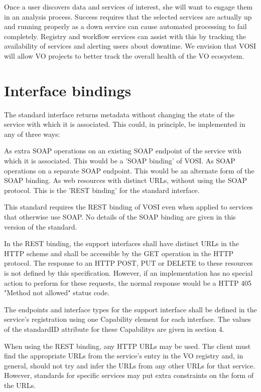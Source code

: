 \documentclass[11pt,letter]{ivoa}
\begin{document}
Once a user discovers data and services of interest, she will want to engage them in an analysis process. Success requires that the selected services are actually up and running properly as a down service can cause automated processing to fail completely. Registry and workflow services can assist with this by tracking the availability of services and alerting users about downtime. We envision that VOSI will allow VO projects to better track the overall health of the VO ecosystem. 

\section{Interface bindings}

The standard interface returns metadata without changing the state of the service with which it is associated. This could, in principle, be implemented in any of three ways:

    As extra SOAP operations on an existing SOAP endpoint of the service with which it is associated. This would be a 'SOAP binding' of VOSI.
    As SOAP operations on a separate SOAP endpoint. This would be an alternate form of the SOAP binding.
    As web resources with distinct URLs, without using the SOAP protocol. This is the 'REST binding' for the standard interface. 

This standard requires the REST binding of VOSI even when applied to services that otherwise use SOAP. No details of the SOAP binding are given in this version of the standard.

In the REST binding, the support interfaces shall have distinct URLs in the HTTP scheme and shall be accessible by the GET operation in the HTTP protocol. The response to an HTTP POST, PUT or DELETE to these resources is not defined by this specification. However, if an implementation has no special action to perform for these requests, the normal response would be a HTTP 405 "Method not allowed" status code.

The endpoints and interface types for the support interface shall be defined in the service's registration using one Capability element for each interface. The values of the standardID attribute for these Capabilitys are given in section 4.

When using the REST binding, any HTTP URLs may be used. The client must find the appropriate URLs from the service's entry in the VO registry and, in general, should not try and infer the URLs from any other URLs for that service. However, standards for specific services may put extra constraints on the form of the URLs.
\end{document}
